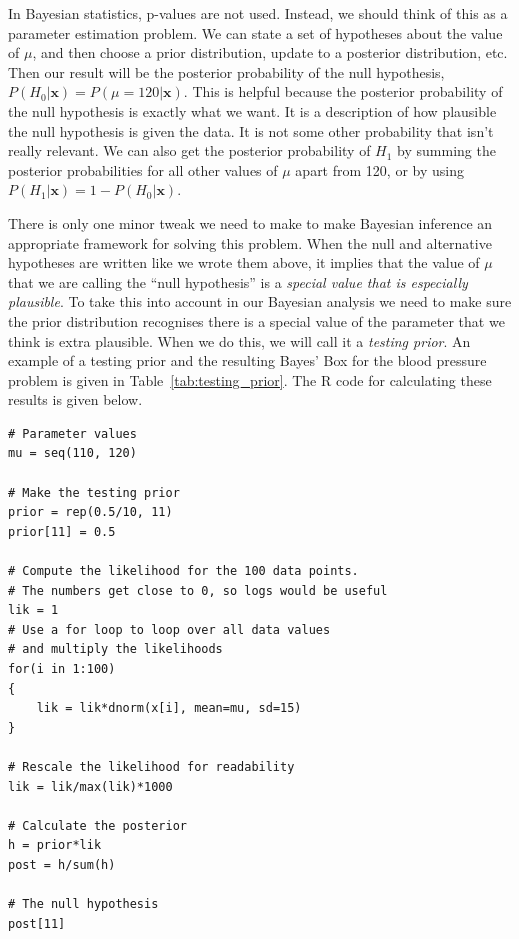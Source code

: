 In Bayesian statistics, p-values are not used. Instead, we should think of this
as a parameter estimation problem. We can state a set of hypotheses about the
value of $\mu$, and then choose a prior distribution, update to a posterior
distribution, etc. Then our result will be the posterior probability of the
null hypothesis, $P(H_0 | \boldsymbol{x}) = P(\mu = 120 | \boldsymbol{x})$.
This is helpful because the posterior probability of the null hypothesis is
exactly what we want. It is a description of how plausible the null hypothesis
is given the data. It is not some other probability that isn't really relevant.
We can also get the posterior probability of $H_1$ by summing the posterior
probabilities for all other values of $\mu$ apart from 120, or by using
$P(H_1 | \boldsymbol{x}) = 1 - P(H_0 | \boldsymbol{x})$.

There is only one minor tweak we need to make to make Bayesian inference an
appropriate framework for solving this problem. When the null and alternative
hypotheses are written like we wrote them above, it implies that the value of $\mu$
that we are calling the ``null hypothesis'' is a {\it special value that is
especially plausible}. To take this into account in our Bayesian analysis we
need to make sure the prior distribution recognises there is a special
value of the parameter that we think is extra plausible. When we do this, we
will call it a {\it testing prior}. An example of a testing prior and the
resulting Bayes' Box for
the blood pressure problem is given in Table~\ref{tab:testing_prior}.
The R code for calculating these results is given below.

\begin{verbatim}
# Parameter values
mu = seq(110, 120)

# Make the testing prior
prior = rep(0.5/10, 11)
prior[11] = 0.5

# Compute the likelihood for the 100 data points.
# The numbers get close to 0, so logs would be useful
lik = 1
# Use a for loop to loop over all data values
# and multiply the likelihoods
for(i in 1:100)
{
    lik = lik*dnorm(x[i], mean=mu, sd=15)
}

# Rescale the likelihood for readability
lik = lik/max(lik)*1000

# Calculate the posterior
h = prior*lik
post = h/sum(h)

# The null hypothesis
post[11]
\end{verbatim}


